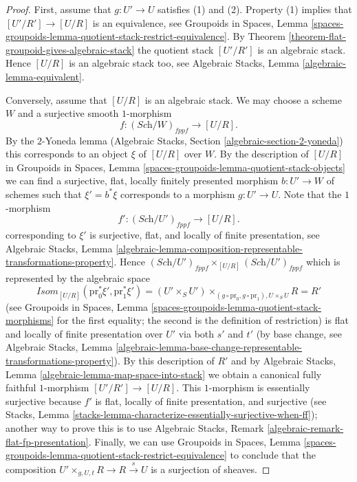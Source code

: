 \begin{proof}
First, assume that $g : U' \to U$ satisfies (1) and (2). Property (1)
implies that $[U'/R'] \to [U/R]$ is an equivalence, see
Groupoids in Spaces,
Lemma \ref{spaces-groupoids-lemma-quotient-stack-restrict-equivalence}.
By
Theorem \ref{theorem-flat-groupoid-gives-algebraic-stack}
the quotient stack $[U'/R']$ is an algebraic stack. Hence
$[U/R]$ is an algebraic stack too, see
Algebraic Stacks, Lemma \ref{algebraic-lemma-equivalent}.

\medskip\noindent
Conversely, assume that $[U/R]$ is an algebraic stack. We may choose a
scheme $W$ and a surjective smooth $1$-morphism
$$
f : (\textit{Sch}/W)_{fppf} \longrightarrow [U/R].
$$
By the $2$-Yoneda lemma
(Algebraic Stacks, Section \ref{algebraic-section-2-yoneda})
this corresponds to an object $\xi$ of $[U/R]$ over $W$.
By the description of $[U/R]$ in
Groupoids in Spaces, Lemma \ref{spaces-groupoids-lemma-quotient-stack-objects}
we can find a surjective, flat, locally finitely presented morphism
$b : U' \to W$ of schemes such that $\xi' = b^*\xi$ corresponds to a morphism
$g : U' \to U$. Note that the $1$-morphism
$$
f' : (\textit{Sch}/U')_{fppf} \longrightarrow [U/R].
$$
corresponding to $\xi'$ is surjective, flat, and locally of finite
presentation, see
Algebraic Stacks, Lemma
\ref{algebraic-lemma-composition-representable-transformations-property}.
Hence
$(\textit{Sch}/U')_{fppf} \times_{[U/R]} (\textit{Sch}/U')_{fppf}$
which is represented by the algebraic space
$$
\mathit{Isom}_{[U/R]}(\text{pr}_0^*\xi', \text{pr}_1^*\xi') =
(U' \times_S U')
\times_{(g \circ \text{pr}_0, g \circ \text{pr}_1), U \times_S U} R = R'
$$
(see
Groupoids in Spaces, Lemma
\ref{spaces-groupoids-lemma-quotient-stack-morphisms}
for the first equality; the second is the definition of restriction)
is flat and locally of finite presentation over $U'$ via both $s'$ and $t'$
(by base change, see
Algebraic Stacks, Lemma
\ref{algebraic-lemma-base-change-representable-transformations-property}).
By this description of $R'$ and by
Algebraic Stacks, Lemma \ref{algebraic-lemma-map-space-into-stack}
we obtain a canonical fully faithful $1$-morphism $[U'/R'] \to [U/R]$.
This $1$-morphism is essentially surjective because $f'$ is flat,
locally of finite presentation, and surjective (see
Stacks, Lemma \ref{stacks-lemma-characterize-essentially-surjective-when-ff});
another way to prove this is to use
Algebraic Stacks, Remark
\ref{algebraic-remark-flat-fp-presentation}.
Finally, we can use
Groupoids in Spaces, Lemma
\ref{spaces-groupoids-lemma-quotient-stack-restrict-equivalence}
to conclude that the composition
$U' \times_{g, U, t} R \to R \xrightarrow{s} U$ is a surjection of sheaves.
\end{proof}

